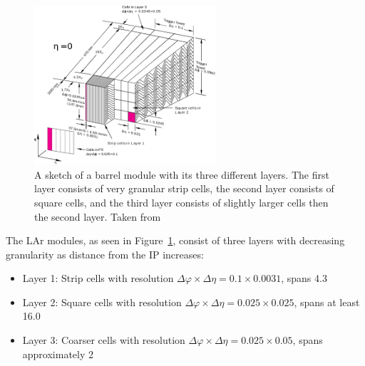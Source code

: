 \begin{figure}[htp]
    \centering
    \includegraphics[width=0.6\textwidth]{figures/atlas/atlas_lar_module_cells.png}
    \caption{A sketch of a barrel module with its three different layers. The first layer consists of very granular strip cells, the second layer consists of square cells, and the third layer consists of slightly larger cells then the second layer. Taken from~\cite{atlas_calorimeter_module_accordion}}\label{fig:atlas_calorimeter_module}
\end{figure}

The LAr modules, as seen in Figure~\ref{fig:atlas_calorimeter_module}, consist of three layers with decreasing granularity as distance from the IP increases:
\begin{itemize}
    \setlength\itemsep{0em}
    \setlength\parskip{0pt}
    \item Layer 1: Strip cells with resolution $\Delta\varphi \times \Delta\eta = 0.1 \times 0.0031$, spans 4.3 \radlength{}
    \item Layer 2: Square cells with resolution $\Delta\varphi \times \Delta\eta = 0.025 \times 0.025$, spans at least 16.0 \radlength{}
    \item Layer 3: Coarser cells with resolution $\Delta\varphi \times \Delta\eta = 0.025 \times 0.05$, spans approximately 2 \radlength{}
\end{itemize}

